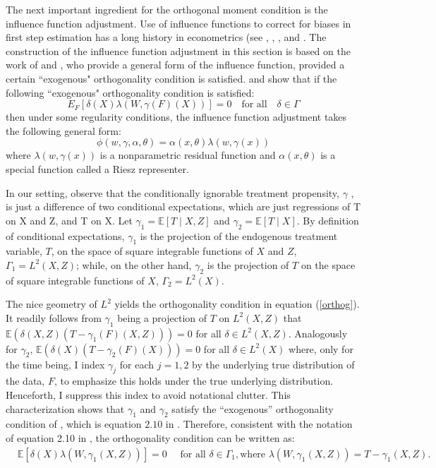 The next important ingredient for the orthogonal moment condition is the influence function adjustment. Use of influence functions to correct for biases in first step estimation has a long history in econometrics (see \citet{newey1994asymptotic}, \citet{hahnridder2013}, \citet{hahn1998role}, and \citet{ai2003efficient}. The construction of the influence function adjustment in this section is based on the work of \citet{chernozhukov2022locally} and \citet{ichimura2022influence}, who provide a general form of the influence function, provided a certain ``exogenous" orthogonality condition is satisfied. \citet{chernozhukov2022locally} and \citet{ichimura2022influence} show that if the following ``exogenous" orthogonality condition is satisfied:
\begin{equation} \label{orthog}
E_F[\delta(X) \lambda(W, \gamma(F)(X))]=0 \quad \text{for all} \quad \delta \in \Gamma
\end{equation}
then under some regularity conditions, the influence function adjustment takes the following general form:
\begin{equation} \label{eq2}
\phi(w, \gamma, \alpha, \theta)=\alpha(x, \theta) \lambda(w, \gamma(x))  
\end{equation}
where $\lambda(w, \gamma(x))$ is a nonparametric residual function and $\alpha(x, \theta)$ is a special function called a Riesz representer. 

In our setting, observe that the conditionally ignorable treatment propensity, $\gamma$ , is just a difference of two conditional expectations, which are just regressions of T on X and Z, and T on X. Let $\gamma_1=\mathbb{E}[T \mid X,Z]$ and $\gamma_2=\mathbb{E}[T \mid X]$. By definition of conditional expectations, $\gamma_1$ is the projection of the endogenous treatment variable, $T$, on the space of square integrable functions of $X$ and $Z$, $\Gamma_1=L^2(X,Z)$; while, on the other hand, $\gamma_2$ is the projection of $T$ on the space of square integrable functions of $X$, $\Gamma_2=L^2(X)$. 

The nice geometry of $L^2$ yields the orthogonality condition in equation (\ref{orthog}). It readily follows from $\gamma_1$ being a projection of $T$ on $L^2(X,Z)$ that $\mathbb{E}(\delta(X,Z)(T - \gamma_1(F)(X,Z)) ) = 0$ for all $\delta \in L^2(X,Z)$. Analogously for $\gamma_2$, $\mathbb{E}(\delta(X)(T - \gamma_2(F)(X)) ) = 0$ for all $\delta \in L^2(X)$ where, only for the time being, I index $\gamma_j$ for each $j=1,2$ by the underlying true distribution of the data, $F$, to emphasize this holds under the true underlying distribution. Henceforth, I suppress this index to avoid notational clutter. This characterization shows that $\gamma_1$ and $\gamma_2$ satisfy the \enquote{exogenous} orthogonality condition of \citet{ichimura2022influence}, which is equation $2.10$ in \citet{chernozhukov2022locally}. Therefore, consistent with the notation of equation 2.10 in \citet{chernozhukov2022locally}, the orthogonality condition can be written as: 
\begin{align*}
    &\mathbb{E}[\delta(X) \lambda(W, \gamma_1(X,Z))]=0 \quad \text { for all } \delta \in \Gamma_1, \text{where } \lambda(W, \gamma_1(X,Z))=T - \gamma_1(X,Z). 
\end{align*}    

